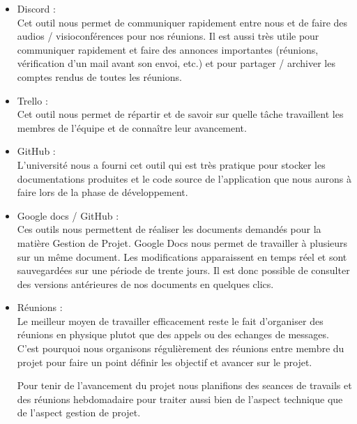 \begin{itemize}
	\item Discord :\\
	Cet outil nous permet de communiquer rapidement entre nous et
de faire des audios / visioconférences pour nos réunions. Il est aussi très utile
pour communiquer rapidement et faire des annonces importantes (réunions,
vérification d’un mail avant son envoi, etc.) et pour partager / archiver les
comptes rendus de toutes les réunions.\\
	\item Trello :\\
	Cet outil nous permet de répartir et de savoir sur quelle tâche
travaillent les membres de l’équipe et de connaître leur avancement.\\
	\item GitHub :\\
	L’université nous a fourni cet outil qui est très pratique pour stocker
les documentations produites et le code source de l’application que nous
aurons à faire lors de la phase de développement.\\
	\item Google docs / GitHub :\\
	Ces outils nous permettent de réaliser les documents demandés
pour la matière Gestion de Projet. Google Docs nous permet de travailler à
plusieurs sur un même document. Les modifications apparaissent en temps
réel et sont sauvegardées sur une période de trente jours. Il est donc possible
de consulter des versions antérieures de nos documents en quelques clics.\\
	\item Réunions :\\
	Le meilleur moyen de travailler efficacement reste le fait d'organiser des réunions en physique 
	plutot que des appels ou des echanges de messages. C'est pourquoi nous organisons régulièrement des réunions
	entre membre du projet pour faire un point définir les objectif et avancer sur le projet.
\\ \newline

Pour tenir de l'avancement du projet nous planifions des seances de travails et des réunions hebdomadaire pour traiter
aussi bien de l'aspect technique que de l'aspect gestion de projet.
\end{itemize}
